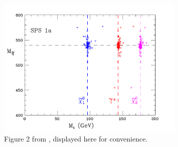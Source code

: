 \documentclass[twoside,english]{uiofysmaster}
\begin{document}
\begin{figure}[hbt]
	\centering
	\includegraphics[width=0.8\textwidth]{figures/webber_rec_table/webber_scatter.png} 
	\caption{Figure 2 from \cite{Webber:2009vm}, displayed here for convenience.}
	\label{fig:webber_scatter}
\end{figure}
\end{document}
